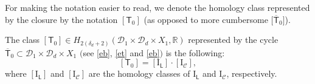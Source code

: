 For making the notation easier to read, we denote the homology class
represented by the closure by the notation $[\mathsf{T}_0]$
\big(as opposed to more cumbersome $\big[\overline{\mathsf{T}}_0\big]$\big).

\begin{lmm}\label{Theo_tzr}
The class $[\mathsf{T}_0] \in H_{2(\delta_d +2)}(\mathcal{D}_1 \times \mathcal{D}_d \times X_1, {\mathbb R})$
represented by the cycle $\overline{\mathsf{T}}_0 \subset \mathcal{D}_1 \times \mathcal{D}_d \times X_1$
$($see \eqref{eb}, \eqref{et} and \eqref{eb}$)$ is the following:
\begin{equation}\label{T0_cycle_expression_base}
[\mathsf{T}_0]  =  [\mathrm{I}_{\mathsf{L}}] \cdot [\mathrm{I}_{\mathcal{C}}],
\end{equation}
where $[\mathrm{I}_{\mathsf{L}}]$ and $[\mathrm{I}_{\mathcal{C}}]$ are the homology classes of
$\mathrm{I}_{\mathsf{L}}$ and $\mathrm{I}_{\mathcal{C}}$, respectively.
\end{lmm}


